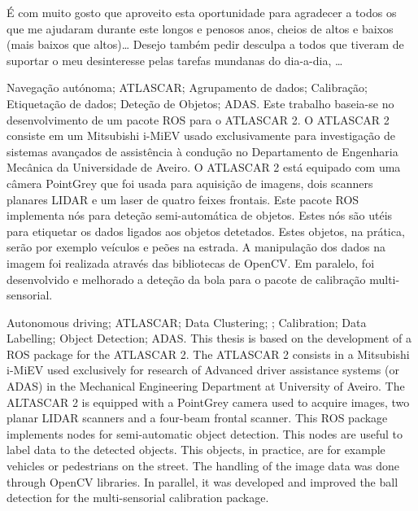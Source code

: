 \documentclass[11pt,twoside,a4paper]{report}
\begin{document}
\TitlePage
  \vspace*{55mm}
       {\'E com muito gosto que aproveito esta oportunidade para agradecer a todos os que me
        ajudaram durante este longos e penosos anos, cheios de altos e baixos (mais baixos que
        altos)\ldots}
  \TEXT{}
       {Desejo tamb\'em pedir desculpa a todos que tiveram de suportar o meu desinteresse pelas
        tarefas mundanas do dia-a-dia, \ldots}
\EndTitlePage
\titlepage\ \endtitlepage %

\TitlePage
  \vspace*{55mm}
  {Navega{\c c}\~ao aut\'onoma; ATLASCAR; Agrupamento de dados; Calibra{\c c}\~ao; Etiqueta\c c\~ao de dados; Dete\c c\~ao de Objetos; ADAS.}
  \vspace*{5mm}
       {Este trabalho baseia-se no desenvolvimento de um pacote ROS para o ATLASCAR 2. O ATLASCAR 2 consiste em um Mitsubishi i-MiEV usado exclusivamente para investiga\c c\~ao de sistemas avan\c cados de assist\^encia \`a condu\c c\~ao no Departamento de Engenharia Mec\^anica da Universidade de Aveiro. O ATLASCAR 2 est\'a equipado com uma c\^amera PointGrey que foi usada para aquisi\c c\~ao de imagens, dois scanners planares LIDAR e um laser de quatro feixes frontais. Este pacote ROS implementa n\'os para dete\c c\~ao semi-autom\'atica de objetos. Estes n\'os s\~ao ut\'eis para etiquetar os dados ligados aos objetos detetados. Estes objetos, na pr\'atica, ser\~ao por exemplo ve\'iculos e pe\~oes na estrada. A manipula\c c\~ao dos dados na imagem foi realizada atrav\'es das bibliotecas de OpenCV. Em paralelo, foi desenvolvido e melhorado a dete\c c\~ao da bola para o pacote de calibra\c c\~ao multi-sensorial.
       	}
\EndTitlePage
\titlepage\ \endtitlepage %

\TitlePage
  \vspace*{55mm}
  {Autonomous driving; ATLASCAR; Data Clustering; ; Calibration; Data Labelling; Object Detection; ADAS.}
  \vspace*{5mm}
       {This thesis is based on the development of a ROS package for the ATLASCAR 2. The ATLASCAR 2 consists in a Mitsubishi i-MiEV used exclusively for research of Advanced driver assistance systems (or ADAS) in the Mechanical Engineering Department at University of Aveiro. The ALTASCAR 2 is equipped with a PointGrey camera used to acquire images, two planar LIDAR scanners and a four-beam frontal scanner. This ROS package implements nodes for semi-automatic object detection. This nodes are useful to label data to the detected objects. This objects, in practice, are for example vehicles or pedestrians on the street. The handling of the image data was done through OpenCV libraries. In parallel, it was developed and improved the ball detection for the multi-sensorial calibration package.
       	}
\EndTitlePage
\titlepage\ \endtitlepage %
\end{document}
